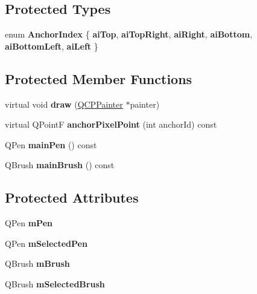\subsection*{Protected Types}
\begin{DoxyCompactItemize}
\item 
\mbox{\label{class_q_c_p_item_rect_af0ebba58e6bca4851c4db726691ec0d3}} 
enum {\bfseries Anchor\+Index} \{ \newline
{\bfseries ai\+Top}, 
{\bfseries ai\+Top\+Right}, 
{\bfseries ai\+Right}, 
{\bfseries ai\+Bottom}, 
\newline
{\bfseries ai\+Bottom\+Left}, 
{\bfseries ai\+Left}
 \}
\end{DoxyCompactItemize}
\subsection*{Protected Member Functions}
\begin{DoxyCompactItemize}
\item 
\mbox{\label{class_q_c_p_item_rect_a18cd583638b876cdd50f1a155ec182aa}} 
virtual void {\bfseries draw} (\mbox{\hyperlink{class_q_c_p_painter}{Q\+C\+P\+Painter}} $\ast$painter)
\item 
\mbox{\label{class_q_c_p_item_rect_af1c42e6142d1137673335982856d0ea6}} 
virtual Q\+PointF {\bfseries anchor\+Pixel\+Point} (int anchor\+Id) const
\item 
\mbox{\label{class_q_c_p_item_rect_af94d87da501e9429c0e874f1c0369b03}} 
Q\+Pen {\bfseries main\+Pen} () const
\item 
\mbox{\label{class_q_c_p_item_rect_a8813d2d670835ac9b8000c981b8ea6fe}} 
Q\+Brush {\bfseries main\+Brush} () const
\end{DoxyCompactItemize}
\subsection*{Protected Attributes}
\begin{DoxyCompactItemize}
\item 
\mbox{\label{class_q_c_p_item_rect_aa0d49323628d6752026056bfb52afd86}} 
Q\+Pen {\bfseries m\+Pen}
\item 
\mbox{\label{class_q_c_p_item_rect_a73cc0bee61de3c67221ec8c7a76a29ed}} 
Q\+Pen {\bfseries m\+Selected\+Pen}
\item 
\mbox{\label{class_q_c_p_item_rect_a2d7f207fada27588b3a52b19234d3c2e}} 
Q\+Brush {\bfseries m\+Brush}
\item 
\mbox{\label{class_q_c_p_item_rect_a21b70eee59b6e19ae0bbdf037b13508f}} 
Q\+Brush {\bfseries m\+Selected\+Brush}
\end{DoxyCompactItemize}
